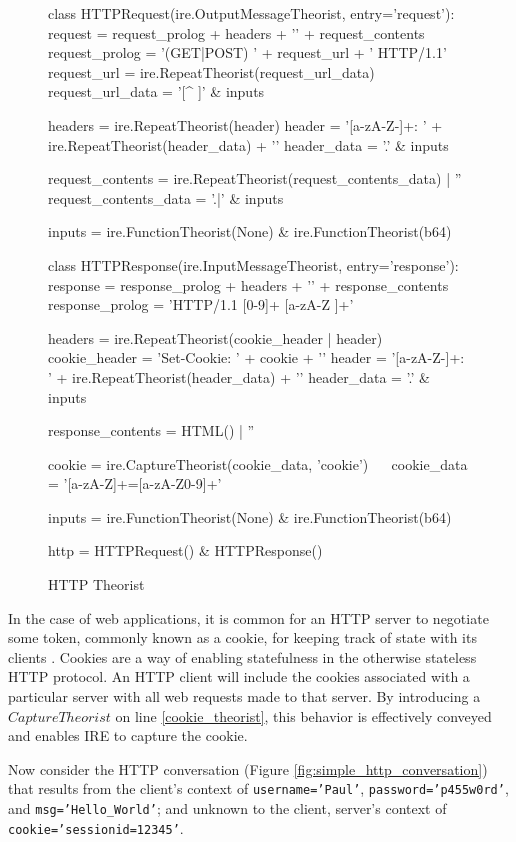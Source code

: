 \begin{figure}[tb]
\begin{pythoncode}
class HTTPRequest(ire.OutputMessageTheorist, entry='request'):
    request = request_prolog + headers + '\n' + request_contents
    request_prolog = '(GET|POST) ' + request_url + ' HTTP/1.1\n'
    request_url = ire.RepeatTheorist(request_url_data)
    request_url_data = '[^ ]' & inputs

    headers = ire.RepeatTheorist(header)
    header = '[a-zA-Z-]+: ' + ire.RepeatTheorist(header_data) + '\n'
    header_data = '.' & inputs

    request_contents = ire.RepeatTheorist(request_contents_data) | ''
    request_contents_data = '.|\n' & inputs

    inputs = ire.FunctionTheorist(None) & ire.FunctionTheorist(b64)


class HTTPResponse(ire.InputMessageTheorist, entry='response'):
    response = response_prolog + headers + '\n' + response_contents
    response_prolog = 'HTTP/1.1 [0-9]+ [a-zA-Z ]+\n'

    headers = ire.RepeatTheorist(cookie_header | header)
    cookie_header = 'Set-Cookie: ' + cookie + '\n'
    header = '[a-zA-Z-]+: ' + ire.RepeatTheorist(header_data) + '\n'
    header_data = '.' & inputs

    response_contents = HTML() | ''

    cookie = ire.CaptureTheorist(cookie_data, 'cookie') ~$\label{cookie_theorist}$~
    cookie_data = '[a-zA-Z]+=[a-zA-Z0-9]+'

    inputs = ire.FunctionTheorist(None) & ire.FunctionTheorist(b64)


http = HTTPRequest() & HTTPResponse()
\end{pythoncode}
\caption{HTTP Theorist}
\label{fig:http_theorist}
\end{figure}

In the case of web applications, it is common for an HTTP server to negotiate some token, commonly known as a cookie, for keeping track of state with its clients \cite{barth2011rfc}.
Cookies are a way of enabling statefulness in the otherwise stateless HTTP protocol.
An HTTP client will include the cookies associated with a particular server with all web requests made to that server.
By introducing a $CaptureTheorist$ on line \ref{cookie_theorist}, this behavior is effectively conveyed and enables IRE to capture the cookie.

Now consider the HTTP conversation (Figure \ref{fig:simple_http_conversation}) that results from the client's context of \texttt{username='Paul'}, \texttt{password='p455w0rd'}, and \texttt{msg='Hello_World'}; and unknown to the client, server's context of \texttt{cookie='sessionid=12345'}.


